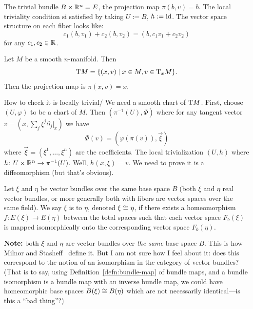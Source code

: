 \begin{example}
The trivial bundle $B\times\mathbb{R}^{n}=E$, the projection map $\pi(b,v)=b$.
The local triviality condition si satisfied by taking $U:=B$,
$h:=\operatorname{id}$. The vector space structure on each fiber looks like:
\begin{equation}
c_{1}(b,v_{1})+c_{2}(b,v_{2})=(b,c_{1}v_{1}+c_{2}v_{2})
\end{equation}
for any $c_{1},c_{2}\in\mathbb{R}$.
\end{example}

\begin{example}
Let $M$ be a smooth $n$-manifold. Then
\begin{equation}
\mathrm{T} M=\{(x,v)\mid x\in M,v\in \mathrm{T}_{x}M\}.
\end{equation}
Then the projection map is $\pi(x,v)=x$.

How to check it is locally trivial/ We need a smooth chart of $\mathrm{T} M$.
First, choose $(U,\varphi)$ to be a chart of $M$. Then
$(\pi^{-1}(U),\Phi)$ where for any tangent vector
$v=(x,\sum_{j}\xi^{j}\partial_{j}|_{x})$ we have
\begin{equation}
\Phi(v)=(\varphi(\pi(v)),\vec{\xi})
\end{equation}
where $\vec{\xi}=(\xi^{1},\dots,\xi^{n})$ are the coefficients. The
local trivialization $(U,h)$ where $h\colon U\times\mathbb{R}^{n}\to\pi^{-1}(U)$.
Well, $h(x,\xi)=v$. We need to prove it is a diffeomorphism (but
that's obvious).
\end{example}

\begin{definition}
Let $\xi$ and $\eta$ be vector bundles over the same base space $B$
(both $\xi$ and $\eta$ real vector bundles, or more generally
both with fibers are vector spaces over the same field).
We say $\xi$ is 
to $\eta$, denoted $\xi\cong\eta$, if there exists a homeomorphism
$f\colon E(\xi)\to E(\eta)$ between the total spaces such that each
vector space $F_{b}(\xi)$ is mapped isomorphically onto the
corresponding vector space $F_{b}(\eta)$.

\textbf{Note:} both $\xi$ and $\eta$ are vector bundles over
\emph{the same} base space $B$. This is how Milnor and
Stasheff~\cite[Ch~2]{milnor1974characteristic} define it. But I am not
sure how I feel about it: does this correspond to the notion of an
isomorphism in the category of vector bundles? (That is to say, using
Definition~\ref{defn:bundle-map} of bundle maps, and a bundle
isomorphism is a bundle map with an inverse bundle map, we could have
homeomorphic base spaces $B(\xi)\cong B(\eta)$ which are not
necessarily identical---is this a ``bad thing''?)
\end{definition}

